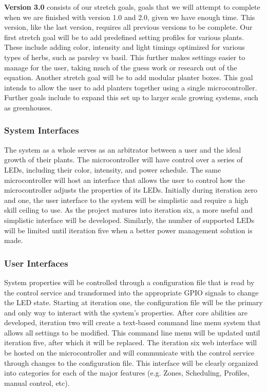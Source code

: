 \documentclass[onecolumn, draftclsnofoot,10pt, compsoc]{IEEEtran}
\begin{document}
		\noindent \textbf{Version 3.0} consists of our stretch goals, goals that we will attempt to complete when we are finished with version 1.0 and 2.0, given we have enough time. This version, like the last version,
		requires all previous versions to be complete. Our first stretch goal will be to add predefined setting profiles for various plants. These include adding color, intensity and light timings optimized
		for various types of herbs, such as parsley vs basil. This further makes settings easier to manage for the user, taking much of the guess work or research out of the equation. Another stretch goal will be
		to add modular planter boxes. This goal intends to allow the user to add planters together using a single microcontroller. Further goals include to expand this set up to larger scale growing systems,
		such as greenhouses.


		\subsubsection{System Interfaces}
				The system as a whole serves as an arbitrator between a user and the ideal growth of their plants.
				The microcontroller will have control over a series of LEDs, including their color, intensity, and power schedule. The same microcontroller will host an interface that allows the user to control
				how the microcontroller adjusts the properties of its LEDs. Initially during iteration zero and one, the user interface to the system will be simplistic and require a high skill ceiling to use. As the project matures into iteration six, a more useful and
				simplistic interface will be developed. Similarly, the number of supported LEDs will be limited until iteration five when a better power management solution is made.
		 \subsubsection{User Interfaces}
				System properties will be controlled through a configuration file that is read by the control service and transformed into the appropriate GPIO signals to change the LED state. Starting at
				iteration one, the configuration file will be the primary and only way to interact with the system's properties. After core abilities are developed, iteration two will create a text-based command
				line menu system that allows all settings to be modified. This command line menu will be updated until iteration five, after which it will be replaced.
				The iteration six web interface will be hosted on the microcontroller and will communicate with the control service through changes to the configuration file. This interface will be clearly
				organized into categories for each of the major features (e.g. Zones, Scheduling, Profiles, manual control, etc).
\end{document}
